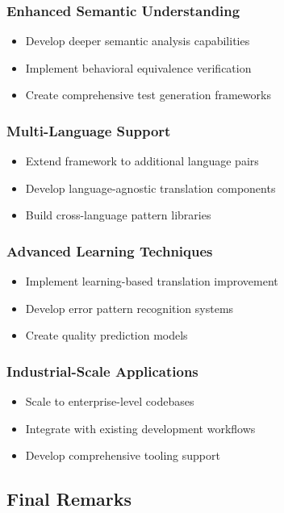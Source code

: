 \subsubsection{Enhanced Semantic Understanding}
\begin{itemize}
\item Develop deeper semantic analysis capabilities
\item Implement behavioral equivalence verification
\item Create comprehensive test generation frameworks
\end{itemize}

\subsubsection{Multi-Language Support}
\begin{itemize}
\item Extend framework to additional language pairs
\item Develop language-agnostic translation components
\item Build cross-language pattern libraries
\end{itemize}

\subsubsection{Advanced Learning Techniques}
\begin{itemize}
\item Implement learning-based translation improvement
\item Develop error pattern recognition systems
\item Create quality prediction models
\end{itemize}

\subsubsection{Industrial-Scale Applications}
\begin{itemize}
\item Scale to enterprise-level codebases
\item Integrate with existing development workflows
\item Develop comprehensive tooling support
\end{itemize}

\subsection{Final Remarks}

